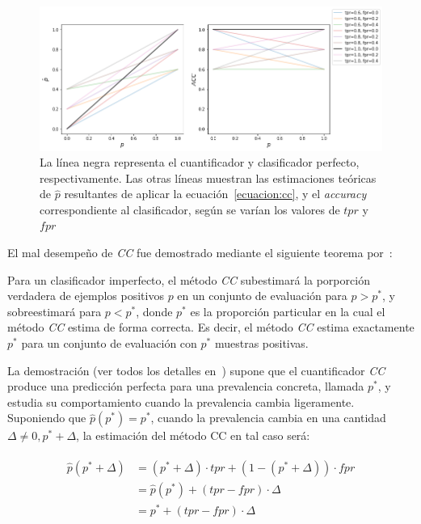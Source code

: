\begin{figure}[h]
    \includegraphics[width=\textwidth]{../plots_teoria/cc_tpr_fpr.png}
    \caption{La línea negra representa el cuantificador y clasificador perfecto,
    respectivamente. Las otras líneas muestran las estimaciones teóricas de
    $\hat p$ resultantes de aplicar la ecuación~\ref{ecuacion:cc}, y el {\it
    accuracy\/} correspondiente al clasificador, según se varían los valores de
    $tpr$ y $fpr$}\label{fig:cc_tpr_fpr}
\end{figure}

El mal desempeño de {\it CC\/} fue demostrado mediante el siguiente teorema
por~\citeauthor{forman2008quantifying}:

\begin{theorem}
    \citep[p.169]{forman2008quantifying}\label{teorema:forman} Para un
    clasificador imperfecto, el método {\it CC\/} subestimará la porporción
    verdadera de ejemplos positivos $p$ en un conjunto de evaluación para
    $p>p^*$, y sobreestimará para $p<p^*$, donde $p^*$ es la proporción
    particular en la cual el método {\it CC\/} estima de forma correcta. Es
    decir, el método {\it CC\/} estima exactamente $p^*$ para un conjunto de
    evaluación con $p^*$ muestras positivas.
\end{theorem}

La demostración (ver todos los detalles en~\citep[p.170]{forman2008quantifying})
supone que el cuantificador {\it CC\/} produce una predicción perfecta para una
prevalencia concreta, llamada $p^*$, y estudia su comportamiento cuando la
prevalencia cambia ligeramente. Suponiendo que $\hat p(p^*) = p^*$, cuando la
prevalencia cambia en una cantidad $\Delta \neq 0, p^* + \Delta$, la estimación
del método CC en tal caso será:

\begin{align}
\begin{split}
    \hat p(p^* + \Delta) &= (p^* + \Delta) \cdot {tpr} + (1-(p^* + \Delta)) \cdot {fpr} \\
    &= \hat p(p^*) + ({tpr} - {fpr}) \cdot \Delta \\
    &= p^* + ({tpr} - {fpr}) \cdot \Delta
\end{split}
\end{align}


